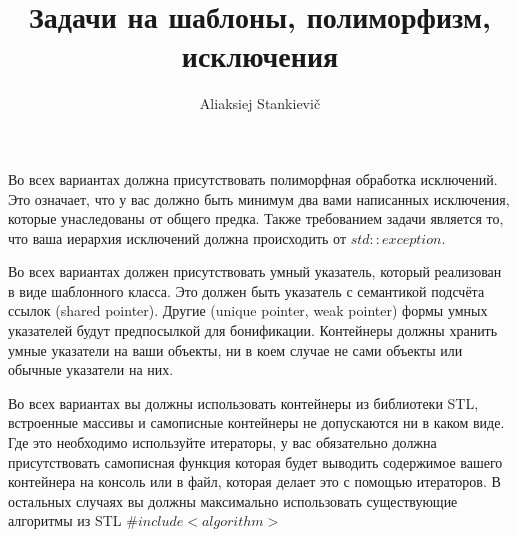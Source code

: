 \documentclass[12pt, oneside]{article}
\author{Aliaksiej Stankievič}
\title{Задачи на шаблоны, полиморфизм, исключения}
\begin{document}
 Во всех вариантах должна присутствовать полиморфная обработка исключений. Это означает, что у вас должно быть минимум два вами написанных исключения, которые унаследованы от общего предка. Также требованием задачи является то, что ваша иерархия исключений должна происходить от $std::exception$.
 
 Во всех вариантах должен присутствовать умный указатель, который реализован в виде шаблонного класса. Это должен быть указатель с семантикой подсчёта ссылок (shared pointer). Другие (unique pointer, weak pointer) формы умных указателей будут предпосылкой для бонификации. Контейнеры должны хранить умные указатели на ваши объекты, ни в коем случае не сами объекты или обычные указатели на них.
 
 Во всех вариантах вы должны использовать контейнеры из библиотеки STL, встроенные массивы и самописные контейнеры не допускаются ни в каком виде. Где это необходимо используйте итераторы, у вас обязательно должна присутствовать самописная функция которая будет выводить содержимое вашего контейнера на консоль или в файл, которая делает это с помощью итераторов. В остальных случаях вы должны максимально использовать существующие алгоритмы из STL $\#include <algorithm>$
 
\end{document}

